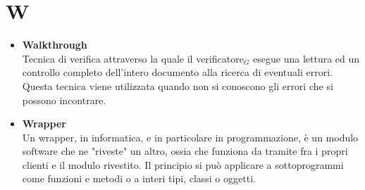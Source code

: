 \chapter{W} \label{W}
	\begin{itemize}
		\item \textbf{Walkthrough}\\
		Tecnica di verifica attraverso la quale il verificatore$_G$	esegue una lettura ed un controllo completo dell’intero documento alla ricerca di eventuali errori.  Questa tecnica viene	utilizzata quando non si conoscono gli errori che si possono incontrare.
		
		\item \textbf{Wrapper}\\
		Un wrapper, in informatica, e in particolare in programmazione, è un modulo software che ne "riveste" un altro, ossia che funziona da tramite fra i propri clienti e il modulo rivestito. Il principio si può applicare a sottoprogrammi come funzioni e metodi o a interi tipi, classi o oggetti.
		
	\end{itemize}